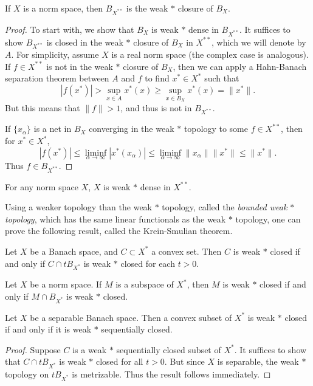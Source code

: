 \begin{theorem}
    If $X$ is a norm space, then $B_{X^{**}}$ is the weak $*$ closure of $B_X$.
\end{theorem}
\begin{proof}
    To start with, we show that $B_X$ is weak $*$ dense in $B_{X^{**}}$. It suffices to show $B_{X^{**}}$ is closed in the weak $*$ closure of $B_X$ in $X^{**}$, which we will denote by $A$. For simplicity, assume $X$ is a real norm space (the complex case is analogous). If $f \in X^{**}$ is not in the weak $*$ closure of $B_X$, then we can apply a Hahn-Banach separation theorem between $A$ and $f$ to find $x^* \in X^*$ such that 
    \[ |f(x^*)| > \sup_{x \in A} x^*(x) \geq \sup_{x \in B_X} x^*(x) = \| x^* \|. \]
    But this means that $\| f \| > 1$, and thus is not in $B_{X^{**}}$.

    If $\{ x_\alpha \}$ is a net in $B_X$ converging in the weak $*$ topology to some $f \in X^{**}$, then for $x^* \in X^*$,
    \[ |f(x^*)| \leq \liminf_{\alpha \to \infty} |x^*(x_\alpha)| \leq \liminf_{\alpha \to \infty} \| x_\alpha \| \| x^* \| \leq \| x^* \|. \]
    Thus $f \in B_{X^{**}}$.
\end{proof}

\begin{corollary}
    For any norm space $X$, $X$ is weak $*$ dense in $X^{**}$.
\end{corollary}

Using a weaker topology than the weak $*$ topology, called the \emph{bounded weak $*$ topology}, which has the same linear functionals as the weak $*$ topology, one can prove the following result, called the Krein-Smulian theorem.

\begin{theorem}
    Let $X$ be a Banach space, and $C \subset X^*$ a convex set. Then $C$ is weak $*$ closed if and only if $C \cap t B_{X^*}$ is weak $*$ closed for each $t > 0$.
\end{theorem}

\begin{corollary}
    Let $X$ be a norm space. If $M$ is a subspace of $X^*$, then $M$ is weak $*$ closed if and only if $M \cap B_{X^*}$ is weak $*$ closed.
\end{corollary}

\begin{corollary}
    Let $X$ be a separable Banach space. Then a convex subset of $X^*$ is weak $*$ closed if and only if it is weak $*$ sequentially closed.
\end{corollary}
\begin{proof}
    Suppose $C$ is a weak $*$ sequentially closed subset of $X^*$. It suffices to show that $C \cap t B_{X^*}$ is weak $*$ closed for all $t > 0$. But since $X$ is separable, the weak $*$ topology on $t B_{X^*}$ is metrizable. Thus the result follows immediately.
\end{proof}


